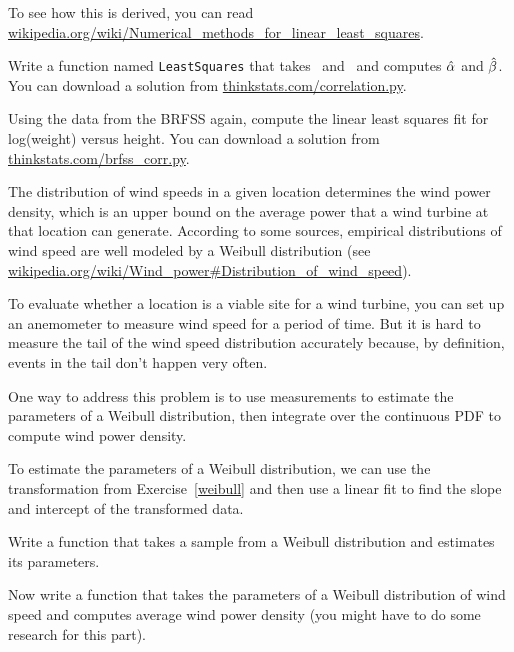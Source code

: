 \documentclass[12pt]{book}
\begin{document}
To see how this is derived, you can read
\url{wikipedia.org/wiki/Numerical_methods_for_linear_least_squares}.


\begin{exercise}
Write a function named {\tt LeastSquares} that takes \X~and \Y~and
computes $\hat{\alpha}$ and $\hat{\beta}$.  You can download a
solution from \url{thinkstats.com/correlation.py}.  

\end{exercise}

\begin{exercise}
Using the data from the BRFSS again, compute the linear least squares
fit for log(weight) versus height.  You can download a
solution from \url{thinkstats.com/brfss_corr.py}.

\end{exercise}


\begin{exercise}
The distribution of wind speeds in a given location determines the
wind power density, which is an upper bound on the average power that
a wind turbine at that location can generate.  According to some
sources, empirical distributions of wind speed are well modeled by a
Weibull distribution (see
\url{wikipedia.org/wiki/Wind_power#Distribution_of_wind_speed}).

To evaluate whether a location is a viable site for a wind turbine,
you can set up an anemometer to measure wind speed for a period of
time.  But it is hard to measure the tail of the wind speed distribution
accurately because, by definition, events in the tail don't happen
very often.

One way to address this problem is to use measurements to estimate the
parameters of a Weibull distribution, then integrate over the
continuous PDF to compute wind power density.

To estimate the parameters of a Weibull distribution, we can use the
transformation from Exercise~\ref{weibull} and then use a linear fit
to find the slope and intercept of the transformed data.

Write a function that takes a sample from a Weibull distribution and
estimates its parameters.

Now write a function that takes the parameters of a Weibull distribution
of wind speed and computes average wind power density (you might have
to do some research for this part).

\end{exercise}
\end{document}

